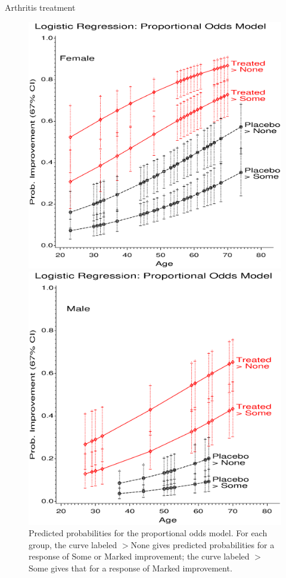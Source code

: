 \begin{Example}[arthrit12]{Arthritis treatment}
\begin{figure}[htb]
 \begin{minipage}[t]{.49\linewidth}
  \includegraphics[width=1\linewidth]{ch6/fig/glogist22}
 \end{minipage}%
 \hfill
 \begin{minipage}[t]{.49\linewidth}
  \includegraphics[width=1\linewidth]{ch6/fig/glogist23}
 \end{minipage}
  \caption[Predicted probabilities for the proportional odds model]{Predicted probabilities for the proportional odds model.
  For each group, the curve labeled $>$None gives predicted probabilities for a response of Some or Marked improvement; the curve labeled $>$Some gives that for a response of Marked improvement.}\label{fig:glogist2}
\end{figure}
\end{Example}
